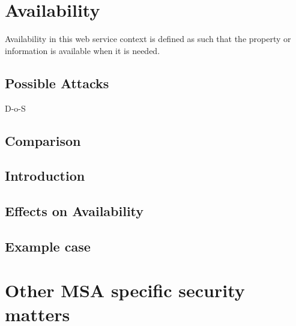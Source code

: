 \section{Availability}
\begin{sloppypar}
    Availability in this web service context is defined as such that the property or information 
    is available when it is needed.

    
    
\end{sloppypar}

\subsection{Possible Attacks}
\begin{sloppypar}
    D-o-S 
\end{sloppypar}



\subsection{Comparison}
\begin{sloppypar}
    
\end{sloppypar}


\subsection{Introduction}
\begin{sloppypar}

\end{sloppypar}

\subsection{Effects on Availability}
\begin{sloppypar}

\end{sloppypar}

\subsection{Example case}
\begin{sloppypar}

\end{sloppypar}




\section{Other MSA specific security matters}
